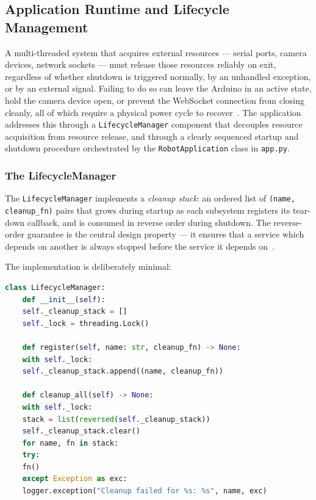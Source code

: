 
\subsection{Application Runtime and Lifecycle Management}
\label{sec:lifecycle}

A multi-threaded system that acquires external resources — serial
ports, camera devices, network sockets — must release those resources
reliably on exit, regardless of whether shutdown is triggered
normally, by an unhandled exception, or by an external signal. Failing
to do so can leave the Arduino in an active state, hold the camera
device open, or prevent the WebSocket connection from closing cleanly,
all of which require a physical power cycle to
recover~\cite{kopetz2011real}. The application addresses this through
a \texttt{LifecycleManager} component that decouples resource
acquisition from resource release, and through a clearly sequenced
startup and shutdown procedure orchestrated by the
\texttt{RobotApplication} class in \texttt{app.py}.

\subsubsection{The LifecycleManager}
\label{sec:lifecycle_manager}

The \texttt{LifecycleManager} implements a \emph{cleanup stack}: an
ordered list of \texttt{(name, cleanup\_fn)} pairs that grows during
startup as each subsystem registers its tear-down callback, and is
consumed in reverse order during shutdown. The reverse-order guarantee
is the central design property — it ensures that a service which
depends on another is always stopped before the service it depends
on~\cite{gamma1994design}.

The implementation is deliberately minimal:

\begin{lstlisting}[language=Python,
	caption={\texttt{LifecycleManager} — registration
		and reverse-order cleanup.},
	label={lst:lifecycle}]
	class LifecycleManager:
	def __init__(self):
	self._cleanup_stack = []
	self._lock = threading.Lock()
	
	def register(self, name: str, cleanup_fn) -> None:
	with self._lock:
	self._cleanup_stack.append((name, cleanup_fn))
	
	def cleanup_all(self) -> None:
	with self._lock:
	stack = list(reversed(self._cleanup_stack))
	self._cleanup_stack.clear()
	for name, fn in stack:
	try:
	fn()
	except Exception as exc:
	logger.exception("Cleanup failed for %s: %s", name, exc)
\end{lstlisting}

